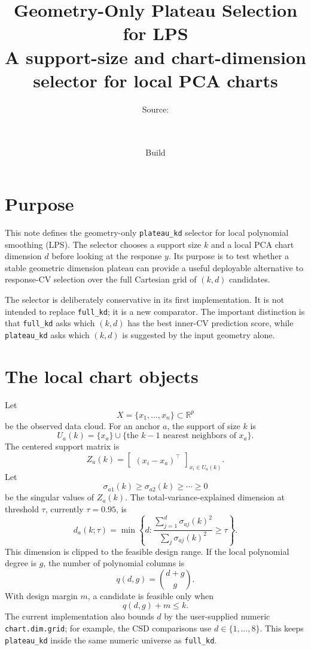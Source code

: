 \documentclass[11pt]{article}
\title{\textbf{Geometry-Only Plateau Selection for LPS}\\[3pt]
\large A support-size and chart-dimension selector for local PCA charts}
\author{\small Source:\\[-1pt]
\begin{minipage}{0.92\textwidth}
\centering\footnotesize\ttfamily
\detokenize{~/current_projects/geosmooth/dev/methods/lps/status/}\\
\detokenize{lps_geometry_only_plateau_kd_selector.tex}
\end{minipage}}
\date{Build \reportbuilddatetime}
\newcommand{\R}{\mathbb{R}}
\newcommand{\code}[1]{\texttt{#1}}
\begin{document}
\maketitle

\section{Purpose}

This note defines the geometry-only \code{plateau\_kd} selector for local
polynomial smoothing (LPS).  The selector chooses a support size \(k\) and a
local PCA chart dimension \(d\) before looking at the response \(y\).  Its
purpose is to test whether a stable geometric dimension plateau can provide a
useful deployable alternative to response-CV selection over the full Cartesian
grid of \((k,d)\) candidates.

The selector is deliberately conservative in its first implementation.  It is
not intended to replace \code{full\_kd}; it is a new comparator.  The important
distinction is that \code{full\_kd} asks which \((k,d)\) has the best inner-CV
prediction score, while \code{plateau\_kd} asks which \((k,d)\) is suggested by
the input geometry alone.

\section{The local chart objects}

Let
\[
  X=\{x_1,\ldots,x_n\}\subset\R^p
\]
be the observed data cloud.  For an anchor \(a\), the support of size \(k\) is
\[
  U_a(k)=\{x_a\}\cup
  \{\text{the }k-1\text{ nearest neighbors of }x_a\}.
\]
The centered support matrix is
\[
  Z_a(k)
  =
  \begin{bmatrix}
  (x_i-x_a)^\top
  \end{bmatrix}_{x_i\in U_a(k)}.
\]
Let
\[
  \sigma_{a1}(k)\ge \sigma_{a2}(k)\ge\cdots\ge 0
\]
be the singular values of \(Z_a(k)\).  The total-variance-explained dimension at
threshold \(\tau\), currently \(\tau=0.95\), is
\[
  d_a(k;\tau)
  =
  \min\left\{
  d:
  \frac{\sum_{j=1}^d \sigma_{aj}(k)^2}
       {\sum_j \sigma_{aj}(k)^2}
  \ge \tau
  \right\}.
\]
This dimension is clipped to the feasible design range.  If the local
polynomial degree is \(g\), the number of polynomial columns is
\[
  q(d,g)=\binom{d+g}{g}.
\]
With design margin \(m\), a candidate is feasible only when
\[
  q(d,g)+m\le k.
\]
The current implementation also bounds \(d\) by the user-supplied numeric
\code{chart.dim.grid}; for example, the CSD comparisons use \(d\in\{1,\ldots,8\}\).
This keeps \code{plateau\_kd} inside the same numeric universe as
\code{full\_kd}.
\end{document}
